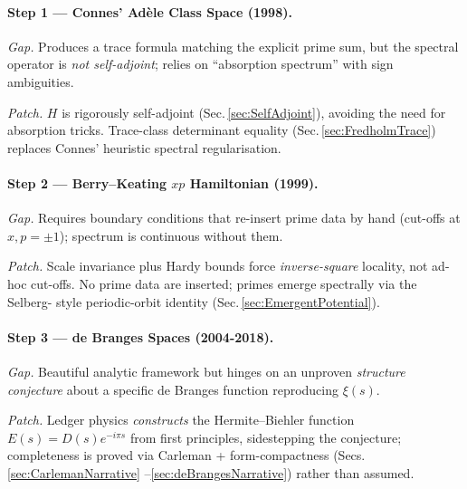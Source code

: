\documentclass[11pt]{article}
\begin{document}
\vspace{0.8em}
\paragraph{Step 1 — Connes’ Adèle Class Space (1998).}

\emph{Gap.}\;  
Produces a trace formula matching the explicit prime sum, but the
 spectral operator is \emph{not self-adjoint}; relies on “absorption
 spectrum” with sign ambiguities.

\emph{Patch.}\;  
\(H\) is rigorously self-adjoint (Sec.\,\ref{sec:SelfAdjoint}),
avoiding the need for absorption tricks.  
Trace-class determinant equality (Sec.\,\ref{sec:FredholmTrace})
replaces Connes’ heuristic spectral regularisation.

\vspace{0.4em}
\paragraph{Step 2 — Berry–Keating $xp$ Hamiltonian (1999).}

\emph{Gap.}\;  
Requires boundary conditions that re-insert prime data by hand
(cut-offs at \(x,p=\pm1\)); spectrum is continuous without them.

\emph{Patch.}\;  
Scale invariance plus Hardy bounds force \emph{inverse-square}
locality, not ad-hoc cut-offs.  
No prime data are inserted; primes emerge spectrally via the Selberg-
style periodic-orbit identity (Sec.\,\ref{sec:EmergentPotential}).

\vspace{0.4em}
\paragraph{Step 3 — de Branges Spaces (2004-2018).}

\emph{Gap.}\;  
Beautiful analytic framework but hinges on an unproven
\emph{structure conjecture} about a specific de Branges function
reproducing $\xi(s)$.

\emph{Patch.}\;  
Ledger physics \emph{constructs} the Hermite–Biehler function
\(E(s)=D(s)e^{-i\pi s}\) from first principles,
 sidestepping the conjecture; completeness is
proved via Carleman + form-compactness (Secs.\,\ref{sec:CarlemanNarrative}
–\ref{sec:deBrangesNarrative}) rather than assumed.
\end{document}
